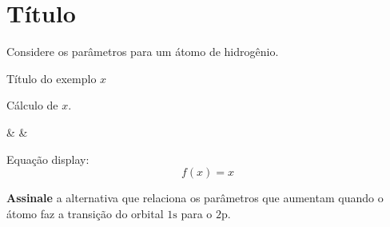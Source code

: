 \section{Título}

Considere os parâmetros para um átomo de hidrogênio.

\begin{example}{Título do exemplo \(x\)}

Cálculo de \(x\).


\end{example}

 &  & 

Equação display: \[
    f(x) = x
\]

\textbf{Assinale} a alternativa que relaciona os parâmetros que aumentam
quando o átomo faz a transição do orbital \(\mathrm{1s}\) para o
\(\mathrm{2p}\).